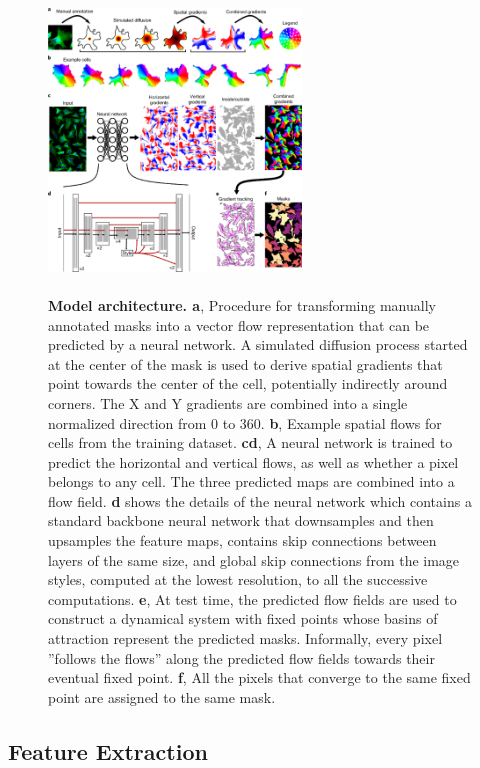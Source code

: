 \documentclass[10pt,twocolumn]{article}
\begin{document}
\begin{figure}[!htb]
\centering
\includegraphics[width=0.6\textwidth, height=8cm]{images/cellpose.png}
\caption{\textbf{Model architecture. a}, Procedure for transforming manually annotated masks into a vector flow representation that can be predicted
by a neural network. A simulated diffusion process started at the center of the mask is used to derive spatial gradients that point towards the
center of the cell, potentially indirectly around corners. The X and Y gradients are combined into a single normalized direction from 0 to 360.
\textbf{b}, Example spatial flows for cells from the training dataset. \textbf{cd}, A neural network is trained to predict the horizontal and vertical flows, as well
as whether a pixel belongs to any cell. The three predicted maps are combined into a flow field. \textbf{d} shows the details of the neural network
which contains a standard backbone neural network that downsamples and then upsamples the feature maps, contains skip connections
between layers of the same size, and global skip connections from the image styles, computed at the lowest resolution, to all the successive
computations. \textbf{e}, At test time, the predicted flow fields are used to construct a dynamical system with fixed points whose basins of attraction
represent the predicted masks. Informally, every pixel ”follows the flows” along the predicted flow fields towards their eventual fixed point. \textbf{f}, All
the pixels that converge to the same fixed point are assigned to the same mask.} 
\label{cellpose}
\end{figure}

\subsection{Feature Extraction}
\end{document}
